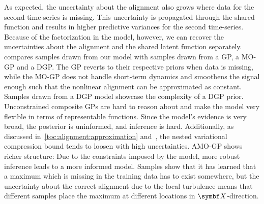 As expected, the uncertainty about the alignment also grows where data for the second time-series is missing.
This uncertainty is propagated through the shared function and results in higher predictive variances for the second time-series.
Because of the factorization in the model, however, we can recover the uncertainties about the alignment and the shared latent function separately.
 compares samples drawn from our model with samples drawn from a GP, a MO-GP and a DGP.
The GP reverts to their respective priors when data is missing, while the MO-GP does not handle short-term dynamics and smoothens the signal enough such that the nonlinear alignment can be approximated as constant.
Samples drawn from a DGP model showcase the complexity of a DGP prior.
Unconstrained composite GPs are hard to reason about and make the model very flexible in terms of representable functions.
Since the model's evidence is very broad, the posterior is uninformed, and inference is hard.
Additionally, as discussed in~\cref{toc:alignment:approximation} and~\parencite{hensman_nested_2014}, the nested variational compression bound tends to loosen with high uncertainties.
AMO-GP shows richer structure:
Due to the constraints imposed by the model, more robust inference leads to a more informed model.
Samples show that it has learned that a maximum which is missing in the training data has to exist somewhere, but the uncertainty about the correct alignment due to the local turbulence means that different samples place the maximum at different locations in $\mat{X}$-direction.

